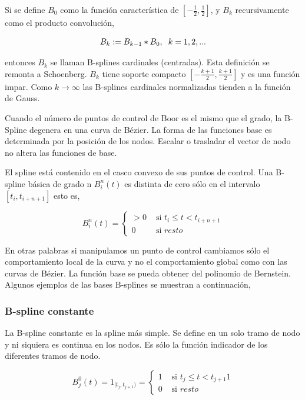 \documentclass[
  12pt,
]{krantz}
\begin{document}
Si se define \(B_{0}\) como la función característica de \({\displaystyle [-{\tfrac {1}{2}},{\tfrac {1}{2}}]}\), y \(B_{k}\) recursivamente como el producto convolución,

\[\displaystyle{B_{k} := B_{k-1}*B_{0}, \hspace{0.2cm} k=1,2,... }\]

entonces \(B_{k}\) se llaman B-splines cardinales (centradas). Esta definición se remonta a Schoenberg. \(B_{k}\) tiene soporte compacto \({\displaystyle [-{\tfrac {k+1}{2}},{\tfrac {k+1}{2}}]}\) y es una función impar. Como \({\displaystyle k\rightarrow \infty }\) las B-splines cardinales normalizadas tienden a la función de Gauss.

Cuando el número de puntos de control de Boor es el mismo que el grado, la B-Spline degenera en una curva de Bézier. La forma de las funciones base es determinada por la posición de los nodos. Escalar o trasladar el vector de nodo no altera las funciones de base.

El spline está contenido en el casco convexo de sus puntos de control. Una B-spline básica de grado n \(B_{i}^{n}(t)\) es distinta de cero sólo en el intervalo \([t_{i}, t_{i+n+1}]\) esto es,

\[
B_{i}^{n}(t)  = \left\{
\begin{array}{ll}
> 0 &  \text{ si }  t_{i}  \leq  t < t_{i+n+1} \\
0   & \text{ si }  resto
\end{array}
\right.
\]

En otras palabras si manipulamos un punto de control cambiamos sólo el comportamiento local de la curva y no el comportamiento global como con las curvas de Bézier. La función base se pueda obtener del polinomio de Bernstein. Algunos ejemplos de las bases B-splines se muestran a continuación,

\hypertarget{b-spline-constante}{%
\subsubsection{B-spline constante}\label{b-spline-constante}}

La B-spline constante es la spline más simple. Se define en un solo tramo de nodo y ni siquiera es continua en los nodos. Es sólo la función indicador de los diferentes tramos de nodo.

\[
B_{j}^{0}(t) = 1_{[t_{j},t_{j+1})}  = \left\{
\begin{array}{ll}
1 &  \text{ si }  t_{j}  \leq  t < t_{j+1}1 \\
0   & \text{ si }  resto
\end{array}
\right.
\]
\end{document}
